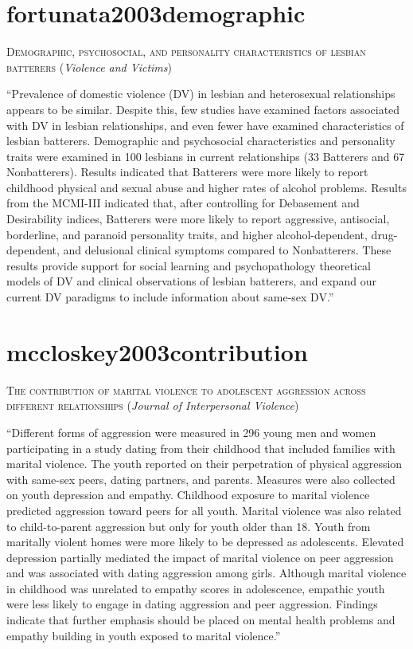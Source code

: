 \documentclass[]{tufte-handout}
\begin{document}
\section{\texorpdfstring{\textcolor[HTML]{5b0057}{fortunata2003demographic}}{}}\label{section-28}

\textsc{\large{Demographic, psychosocial, and personality characteristics of lesbian batterers}}
(\emph{Violence and Victims})

``Prevalence of domestic violence (DV) in lesbian and heterosexual
relationships appears to be similar. Despite this, few studies have
examined factors associated with DV in lesbian relationships, and even
fewer have examined characteristics of lesbian batterers. Demographic
and psychosocial characteristics and personality traits were examined in
100 lesbians in current relationships (33 Batterers and 67
Nonbatterers). Results indicated that Batterers were more likely to
report childhood physical and sexual abuse and higher rates of alcohol
problems. Results from the MCMI-III indicated that, after controlling
for Debasement and Desirability indices, Batterers were more likely to
report aggressive, antisocial, borderline, and paranoid personality
traits, and higher alcohol-dependent, drug-dependent, and delusional
clinical symptoms compared to Nonbatterers. These results provide
support for social learning and psychopathology theoretical models of DV
and clinical observations of lesbian batterers, and expand our current
DV paradigms to include information about same-sex DV.''

\section{\texorpdfstring{\textcolor[HTML]{5b0057}{mccloskey2003contribution}}{}}\label{section-29}

\textsc{\large{The contribution of marital violence to adolescent aggression across different relationships}}
(\emph{Journal of Interpersonal Violence})

``Different forms of aggression were measured in 296 young men and women
participating in a study dating from their childhood that included
families with marital violence. The youth reported on their perpetration
of physical aggression with same-sex peers, dating partners, and
parents. Measures were also collected on youth depression and empathy.
Childhood exposure to marital violence predicted aggression toward peers
for all youth. Marital violence was also related to child-to-parent
aggression but only for youth older than 18. Youth from maritally
violent homes were more likely to be depressed as adolescents. Elevated
depression partially mediated the impact of marital violence on peer
aggression and was associated with dating aggression among girls.
Although marital violence in childhood was unrelated to empathy scores
in adolescence, empathic youth were less likely to engage in dating
aggression and peer aggression. Findings indicate that further emphasis
should be placed on mental health problems and empathy building in youth
exposed to marital violence.''
\end{document}
